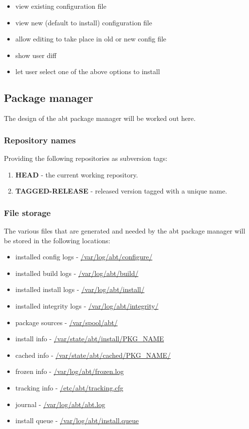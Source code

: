 \begin{itemize}
  \item view existing configuration file
  \item view new (default to install) configuration file
  \item allow editing to take place in old or new config file
  \item show user diff
  \item let user select one of the above options to install
\end{itemize}


\subsection{Package manager}
The design of the abt package manager will be worked out here.

\subsubsection{Repository names}
Providing the following repositories as subversion tags:

\begin{enumerate}
  \item \textbf{HEAD} - the current working repository.
  \item \textbf{TAGGED-RELEASE} - released version tagged with a unique name.
\end{enumerate}

\subsubsection{File storage}
The various files that are generated and needed by the abt package manager will be stored in the following locations:

\begin{itemize}
  \item installed config logs - \url{/var/log/abt/configure/}
  \item installed build logs - \url{/var/log/abt/build/}
  \item installed install logs - \url{/var/log/abt/install/}
  \item installed integrity logs - \url{/var/log/abt/integrity/}
  \item package sources - \url{/var/spool/abt/}
  \item install info - \url{/var/state/abt/install/PKG_NAME}
  \item cached info - \url{/var/state/abt/cached/PKG_NAME/}
  \item frozen info - \url{/var/log/abt/frozen.log}
  \item tracking info - \url{/etc/abt/tracking.cfg}
  \item journal - \url{/var/log/abt/abt.log}
  \item install queue - \url{/var/log/abt/install.queue}
\end{itemize}
